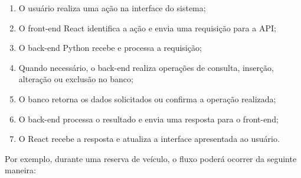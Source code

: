 \documentclass[12pt,a4paper]{report}
\begin{document}
\begin{enumerate}

    \item O usuário realiza uma ação na interface do sistema;

    \item O front-end React identifica a ação e envia uma
    requisição para a API;

    \item O back-end Python recebe e processa a requisição;

    \item Quando necessário, o back-end realiza operações de
    consulta, inserção, alteração ou exclusão no banco;

    \item O banco retorna os dados solicitados ou confirma a
    operação realizada;

    \item O back-end processa o resultado e envia uma resposta
    para o front-end;

    \item O React recebe a resposta e atualiza a interface
    apresentada ao usuário.

\end{enumerate}

Por exemplo, durante uma reserva de veículo, o fluxo poderá
ocorrer da seguinte maneira:

\begin{center}


\end{center}
\end{document}
